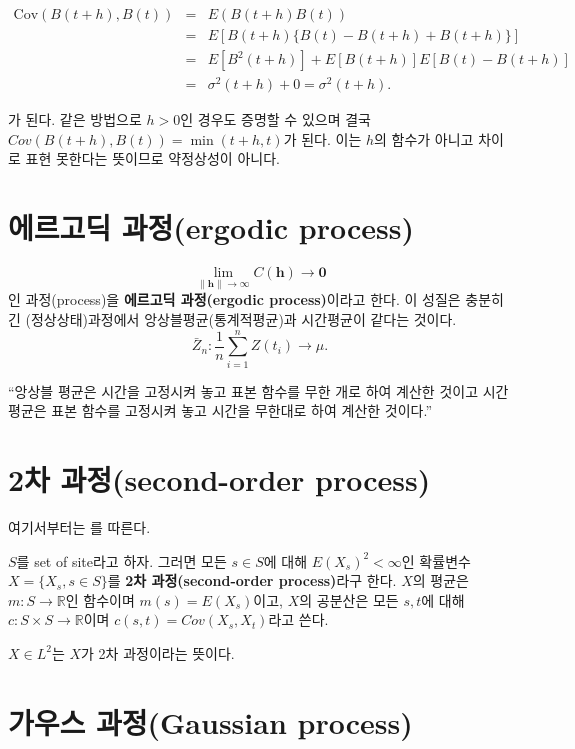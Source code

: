 \documentclass[b5paper,]{scrbook}
\theoremstyle{plain}
\theoremstyle{definition}
\numberwithin{equation}{section}
\let\BeginKnitrBlock\begin \let\EndKnitrBlock\end
\begin{document}
\begin{eqnarray}
\text{Cov}(B(t+h),B(t)) &=& E(B(t+h)B(t))\nonumber\\
&=&E[B(t+h)\{B(t)-B(t+h)+B(t+h)\}]\nonumber\\
&=&E[B^{2}(t+h)]+E[B(t+h)]E[B(t)-B(t+h)]\nonumber\\
&=&\sigma^{2}(t+h)+0=\sigma^{2}(t+h).
\end{eqnarray}

가 된다. 같은 방법으로 \(h > 0\)인 경우도 증명할 수 있으며 결국
\(Cov(B(t+h),B(t))=\min (t+h,t)\)가 된다. 이는 \(h\)의 함수가 아니고
차이로 표현 못한다는 뜻이므로 약정상성이 아니다.

\section{에르고딕 과정(ergodic process)}\label{-ergodic-process}

\[\lim_{\|\mathbf{h}\| \rightarrow \infty}C(\mathbf{h}) \rightarrow \mathbf{0}\]
인 과정(process)을 \textbf{에르고딕 과정(ergodic process)}이라고 한다.
이 성질은 충분히 긴 (정상상태)과정에서 앙상블평균(통계적평균)과
시간평균이 같다는 것이다.
\[\bar{Z}_{n}:\frac{1}{n}\sum_{i=1}^{n}Z(t_{i}) \rightarrow \mu .\]

``앙상블 평균은 시간을 고정시켜 놓고 표본 함수를 무한 개로 하여 계산한
것이고 시간평균은 표본 함수를 고정시켜 놓고 시간을 무한대로 하여 계산한
것이다.''

\section{2차 과정(second-order process)}\label{-second-order-process}

여기서부터는 \citep{Gaetan2009}를 따른다.

\BeginKnitrBlock{definition}[2차 과정]
\protect\hypertarget{def:unnamed-chunk-259}{}{\label{def:unnamed-chunk-259}
{} }\(S\)를 set of site라고 하자. 그러면 모든
\(s\in S\)에 대해 \(E(X_{s})^{2}<\infty\)인 확률변수
\(X=\{X_{s}, s\in S\}\)를 \textbf{2차 과정(second-order process)}라구
한다. \(X\)의 평균은 \(m:S\rightarrow \mathbb{R}\)인 함수이며
\(m(s)=E(X_{s})\)이고, \(X\)의 공분산은 모든 \(s,t\)에 대해
\(c: S\times S \rightarrow \mathbb{R}\)이며
\(c(s,t)=Cov(X_{s},X_{t})\)라고 쓴다.
\EndKnitrBlock{definition}

\(X\in L^{2}\)는 \(X\)가 2차 과정이라는 뜻이다.

\section{가우스 과정(Gaussian process)}\label{-gaussian-process}
\end{document}
